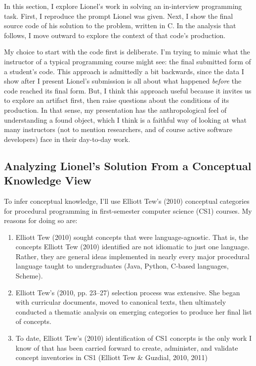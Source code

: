 In this section, I explore Lionel's work in solving an in-interview
programming task. First, I reproduce the prompt Lionel was given. Next,
I show the final source code of his solution to the problem, written in
C. In the analysis that follows, I move outward to explore the context
of that code's production.

My choice to start with the code first is deliberate. I'm trying to
mimic what the instructor of a typical programming course might see: the
final submitted form of a student's code. This approach is admittedly a
bit backwards, since the data I show after I present Lionel's submission
is all about what happened \emph{before} the code reached its final
form. But, I think this approach useful because it invites us to explore
an artifact first, then raise questions about the conditions of its
production. In that sense, my presentation has the anthropological feel
of understanding a found object, which I think is a faithful way of
looking at what many instructors (not to mention researchers, and of
course active software developers) face in their day-to-day work.

\subsection{\texorpdfstring{\protect\hypertarget{ux5fToc247188555}{}{\protect\hypertarget{ux5fToc252445950}{}{}}Analyzing
Lionel's Solution From a Conceptual Knowledge
View}{Analyzing Lionel's Solution From a Conceptual Knowledge View}}\label{analyzing-lionels-solution-from-a-conceptual-knowledge-view}

To infer conceptual knowledge, I'll use Elliott Tew's (2010) conceptual
categories for procedural programming in first-semester computer science
(CS1) courses. My reasons for doing so are:

\begin{enumerate}
\def\labelenumi{\arabic{enumi}.}
\item
  Elliott Tew (2010) sought concepts that were language-agnostic. That
  is, the concepts Elliott Tew (2010) identified are not idiomatic to
  just one language. Rather, they are general ideas implemented in
  nearly every major procedural language taught to undergraduates (Java,
  Python, C-based languages, Scheme).
\item
  Elliott Tew's (2010, pp. 23--27) selection process was extensive. She
  began with curricular documents, moved to canonical texts, then
  ultimately conducted a thematic analysis on emerging categories to
  produce her final list of concepts.
\item
  To date, Elliott Tew's (2010) identification of CS1 concepts is the
  only work I know of that has been carried forward to create,
  administer, and validate concept inventories in CS1 (Elliott Tew \&
  Guzdial, 2010, 2011)
\end{enumerate}

